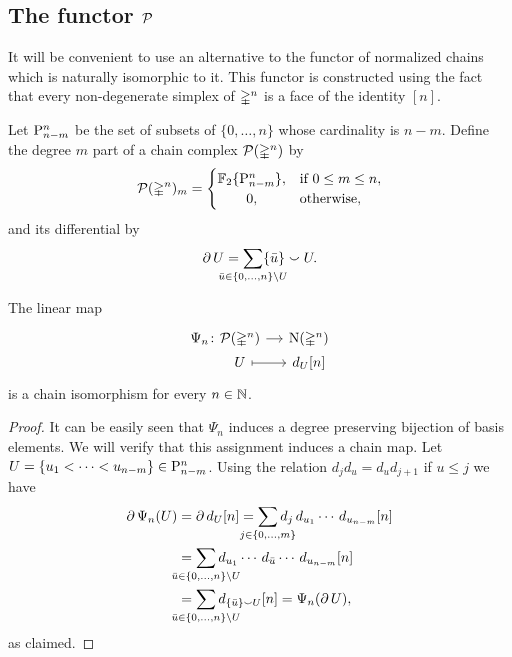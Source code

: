 \subsection{The functor $\cP$}

It will be convenient to use an alternative to the functor of normalized chains which is naturally isomorphic to it.
This functor is constructed using the fact that every non-degenerate simplex of $\simplex^n$ is a face of the identity $[n]$.

\begin{definition}\label{d:dual chains}
	Let $\P_{n-m}^n$ be the set of subsets of $\{0, \dots, n\}$ whose cardinality is $n-m$.
	Define the degree $m$ part of a chain complex $\cP(\simplex^n)$ by
	\[
	\cP(\simplex^n)_m = \begin{cases}
	\F\{\P_{n-m}^n\}, & \text{if } 0 \leq m \leq n, \\
	\hfil 0, & \text{otherwise},
	\end{cases}
	\]
	and its differential by
	\begin{equation}\label{e:boundary of P}
	\bd U =
	\sum_{\mathclap{\bar u \in \{0, \dots, n\} \setminus U}} \{\bar u\} \union U.
	\end{equation}
\end{definition}

\begin{lemma}
	The linear map
	\[
	\begin{tikzcd} [column sep=small, row sep=0]
	\Psi_n \colon &[-20pt] \cP(\simplex^n) \arrow[r] & \chains(\simplex^n) \\
	& U \arrow[r, mapsto] & d_U [n]
	\end{tikzcd}
	\]
	is a chain isomorphism for every $n \in \N$.
\end{lemma}

\begin{proof}
	It can be easily seen that $\Psi_n$ induces a degree preserving bijection of basis elements.
	We will verify that this assignment induces a chain map.
	Let $U = \{u_1 < \cdots < u_{n-m}\} \in \rP_{n-m}^n$.
	Using the relation $d_jd_u = d_ud_{j+1}$ if $u \leq j$ we have
	\begin{align*}
	\bd \Psi_n(U) &=
	\bd d_U[n] =
	\sum_{\mathclap{j \in \{0, \dots, m\}}}
	d_j\, d_{u_1} \cdots\, d_{u_{n-m}}[n] \\ &=
	\sum_{\mathclap{\bar u \in \{0, \dots, n\} \setminus U}}
	d_{u_1} \cdots\, d_{\bar{u}} \cdots\, d_{u_{n-m}}[n] \\ &=
	\sum_{\mathclap{\bar u \in \{0, \dots, n\} \setminus U}}
	d_{\{\bar u\} \union U}[n] =
	\Psi_n(\bd U),
	\end{align*}
	as claimed.
\end{proof}

